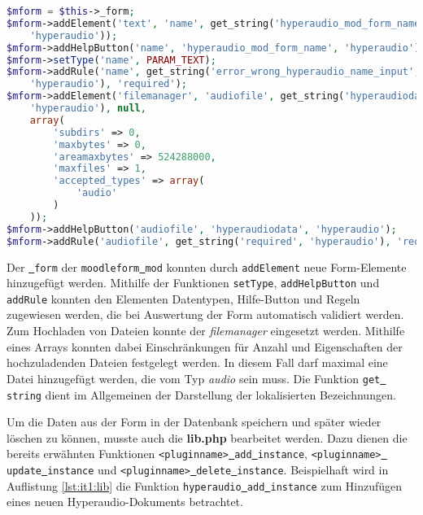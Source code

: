 \begin{lstlisting}[language=php,
             linewidth=\textwidth,
             caption={Ausschnitt der \textbf{mod\underline{{ }}form.php} in der 1. Iteration},
             label={lst:it1:modform}]
$mform = $this->_form;
$mform->addElement('text', 'name', get_string('hyperaudio_mod_form_name',
    'hyperaudio'));
$mform->addHelpButton('name', 'hyperaudio_mod_form_name', 'hyperaudio');
$mform->setType('name', PARAM_TEXT);
$mform->addRule('name', get_string('error_wrong_hyperaudio_name_input',
    'hyperaudio'), 'required');
$mform->addElement('filemanager', 'audiofile', get_string('hyperaudiodata',
    'hyperaudio'), null,
    array(
        'subdirs' => 0,
        'maxbytes' => 0,
        'areamaxbytes' => 524288000,
        'maxfiles' => 1,
        'accepted_types' => array(
            'audio'
        )
    ));
$mform->addHelpButton('audiofile', 'hyperaudiodata', 'hyperaudio');
$mform->addRule('audiofile', get_string('required', 'hyperaudio'), 'required');
\end{lstlisting}

Der \texttt{\underline{{ }}form} der \texttt{moodleform\underline{{ }}mod} konnten durch \texttt{addElement} neue Form-Elemente hinzugefügt werden. Mithilfe der Funktionen \texttt{setType}, \texttt{addHelpButton} und \texttt{addRule} konnten den Elementen Datentypen, Hilfe-Button und Regeln zugewiesen werden, die bei Auswertung der Form automatisch validiert werden. Zum Hochladen von Dateien konnte der \textit{filemanager} eingesetzt werden. Mithilfe eines Arrays konnten dabei Einschränkungen für Anzahl und Eigenschaften der hochzuladenden Dateien festgelegt werden. In diesem Fall darf maximal eine Datei hinzugefügt werden, die vom Typ \textit{audio} sein muss. Die Funktion \texttt{get\underline{{ }}string} dient im Allgemeinen der Darstellung der lokalisierten Bezeichnungen.

Um die Daten aus der Form in der Datenbank speichern und später wieder löschen zu können, musste auch die \textbf{lib.php} bearbeitet werden. Dazu dienen die bereits erwähnten Funktionen \texttt{<pluginname>\underline{{ }}add\underline{{ }}instance}, \texttt{<pluginname>\underline{{ }}update\underline{{ }}instance} und \texttt{<pluginname>\underline{{ }}delete\underline{{ }}instance}. Beispielhaft wird in Auflistung \ref{lst:it1:lib} die Funktion \texttt{hyperaudio\underline{{ }}add\underline{{ }}instance} zum Hinzufügen eines neuen Hyperaudio-Dokuments betrachtet. 

